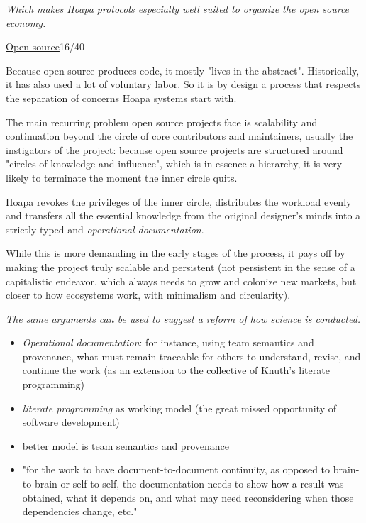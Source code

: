 \documentclass[a4paper,10pt]{article}
\newcommand{\slidehead}[2]{\par\addvspace{7pt}\noindent\underline{#1}\hfill{\color{gray}#2}\par\nopagebreak\vspace{1pt}}
\newcommand{\transition}[1]{\par{\color{black!70}\emph{#1}}\par}
\newcommand{\marked}[1]{\par\addvspace{2pt}{\bfseries #1}\par\nopagebreak}
\renewenvironment{leftbar}{%
  \def\FrameCommand{{\color{black!30}\vrule width 1.2pt}\hspace{6pt}}%
  \MakeFramed{\advance\hsize-\width \FrameRestore}}{\endMakeFramed}
\newenvironment{commentary}{\par\vspace{-2pt}\begin{leftbar}\color{black!80}}{\end{leftbar}}
\begin{document}
\transition{Which makes Hoapa protocols especially well suited to organize the open source economy.}
\slidehead{Open source}{16/40}
Because open source produces code, it mostly "lives in the abstract". Historically, it has also used a lot of voluntary labor. So it is by design a process that respects the separation of concerns Hoapa systems start with.\par
The main recurring problem open source projects face is scalability and continuation beyond the circle of core contributors and maintainers, usually the instigators of the project: because open source projects are structured around "circles of knowledge and influence", which is in essence a hierarchy, it is very likely to terminate the moment the inner circle quits.\par
Hoapa revokes the privileges of the inner circle, distributes the workload evenly and transfers all the essential knowledge from the original designer's minds into a strictly typed and \textcolor{documentationink}{\emph{operational documentation}}.\par
While this is more demanding in the early stages of the process, it pays off by making the project truly scalable and persistent (not persistent in the sense of a capitalistic endeavor, which always needs to grow and colonize new markets, but closer to how ecosystems work, with minimalism and circularity).\par
\transition{The same arguments can be used to suggest a reform of how science is conducted.}
\begin{itemize}
\item \textcolor{documentationink}{\emph{Operational documentation}}: for instance, using team semantics and provenance, what must remain traceable for others to understand, revise, and continue the work (as an extension to the collective of Knuth's literate programming)
\end{itemize}
\begin{commentary}
\marked{\textcolor{documentationink}{Operational documentation}}
\begin{itemize}
\item \emph{literate programming} as working model (the great missed opportunity of software development)
\item better model is team semantics and provenance
\item "for the work to have document-to-document continuity, as opposed to brain-to-brain or self-to-self, the documentation needs to show how a result was obtained, what it depends on, and what may need reconsidering when those dependencies change, etc."
\end{itemize}
\end{commentary}
\end{document}
